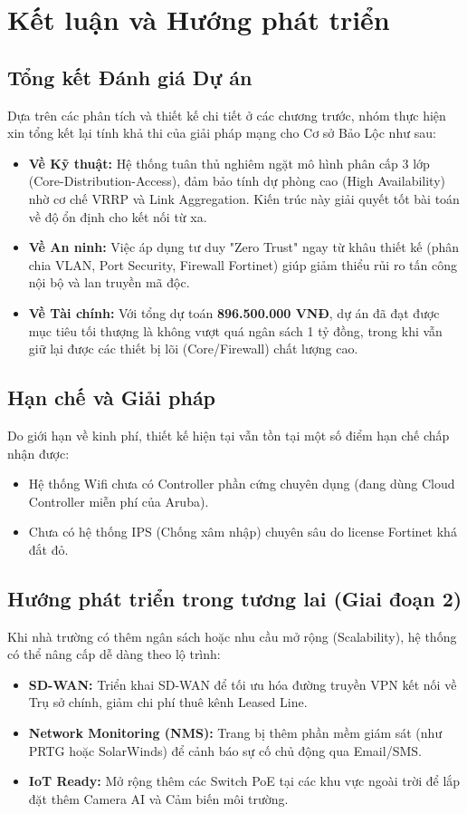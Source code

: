 \section{Kết luận và Hướng phát triển}

\subsection{Tổng kết Đánh giá Dự án}
Dựa trên các phân tích và thiết kế chi tiết ở các chương trước, nhóm thực hiện xin tổng kết lại tính khả thi của giải pháp mạng cho Cơ sở Bảo Lộc như sau:

\begin{itemize}
    \item \textbf{Về Kỹ thuật:} Hệ thống tuân thủ nghiêm ngặt mô hình phân cấp 3 lớp (Core-Distribution-Access), đảm bảo tính dự phòng cao (High Availability) nhờ cơ chế VRRP và Link Aggregation. Kiến trúc này giải quyết tốt bài toán về độ ổn định cho kết nối từ xa.
    \item \textbf{Về An ninh:} Việc áp dụng tư duy "Zero Trust" ngay từ khâu thiết kế (phân chia VLAN, Port Security, Firewall Fortinet) giúp giảm thiểu rủi ro tấn công nội bộ và lan truyền mã độc.
    \item \textbf{Về Tài chính:} Với tổng dự toán \textbf{896.500.000 VNĐ}, dự án đã đạt được mục tiêu tối thượng là không vượt quá ngân sách 1 tỷ đồng, trong khi vẫn giữ lại được các thiết bị lõi (Core/Firewall) chất lượng cao.
\end{itemize}

\subsection{Hạn chế và Giải pháp}
Do giới hạn về kinh phí, thiết kế hiện tại vẫn tồn tại một số điểm hạn chế chấp nhận được:
\begin{itemize}
    \item Hệ thống Wifi chưa có Controller phần cứng chuyên dụng (đang dùng Cloud Controller miễn phí của Aruba).
    \item Chưa có hệ thống IPS (Chống xâm nhập) chuyên sâu do license Fortinet khá đắt đỏ.
\end{itemize}

\subsection{Hướng phát triển trong tương lai (Giai đoạn 2)}
Khi nhà trường có thêm ngân sách hoặc nhu cầu mở rộng (Scalability), hệ thống có thể nâng cấp dễ dàng theo lộ trình:
\begin{itemize}
    \item \textbf{SD-WAN:} Triển khai SD-WAN để tối ưu hóa đường truyền VPN kết nối về Trụ sở chính, giảm chi phí thuê kênh Leased Line.
    \item \textbf{Network Monitoring (NMS):} Trang bị thêm phần mềm giám sát (như PRTG hoặc SolarWinds) để cảnh báo sự cố chủ động qua Email/SMS.
    \item \textbf{IoT Ready:} Mở rộng thêm các Switch PoE tại các khu vực ngoài trời để lắp đặt thêm Camera AI và Cảm biến môi trường.
\end{itemize}